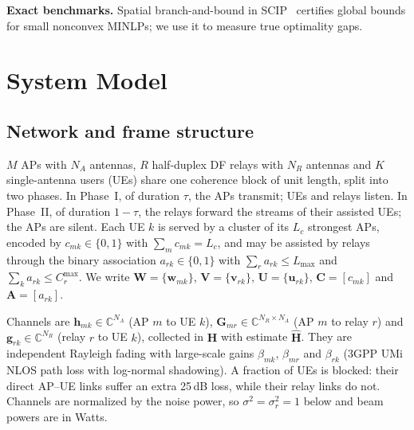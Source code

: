 \documentclass[conference]{IEEEtran}
\newcommand{\C}{\mathbb{C}}
\begin{document}
\textbf{Exact benchmarks.} Spatial branch-and-bound in
SCIP~\cite{bestuzheva2021scip} certifies global bounds for small nonconvex
MINLPs; we use it to measure true optimality gaps.

\section{System Model}
\subsection{Network and frame structure}
$M$ APs with $N_A$ antennas, $R$ half-duplex DF relays with $N_R$ antennas and
$K$ single-antenna users (UEs) share one coherence block of unit length, split
into two phases. In Phase~I, of duration $\tau$, the APs transmit; UEs and
relays listen. In Phase~II, of duration $1-\tau$, the relays forward the
streams of their assisted UEs; the APs are silent. Each UE $k$ is served by a
cluster of its $L_c$ strongest APs, encoded by $c_{mk}\in\{0,1\}$ with
$\sum_m c_{mk}=L_c$, and may be assisted by relays through the binary
association $a_{rk}\in\{0,1\}$ with $\sum_r a_{rk}\le L_{\max}$ and
$\sum_k a_{rk}\le C_r^{\max}$. We write $\mathbf{W}=\{\mathbf{w}_{mk}\}$,
$\mathbf{V}=\{\mathbf{v}_{rk}\}$, $\mathbf{U}=\{\mathbf{u}_{rk}\}$,
$\mathbf{C}=[c_{mk}]$ and $\mathbf{A}=[a_{rk}]$.

Channels are $\mathbf{h}_{mk}\in\C^{N_A}$ (AP $m$ to UE $k$),
$\mathbf{G}_{mr}\in\C^{N_R\times N_A}$ (AP $m$ to relay $r$) and
$\mathbf{g}_{rk}\in\C^{N_R}$ (relay $r$ to UE $k$), collected in
$\mathbf{H}$ with estimate $\hat{\mathbf{H}}$. They are independent Rayleigh
fading with large-scale gains $\beta_{mk}$, $\beta_{mr}$ and $\beta_{rk}$
(3GPP UMi NLOS path loss with log-normal shadowing). A fraction of UEs is
blocked: their direct AP--UE links suffer an extra 25\,dB
loss, while their relay links do not. Channels are normalized by the noise
power, so $\sigma^2=\sigma_r^2=1$ below and beam powers are in Watts.
\end{document}
